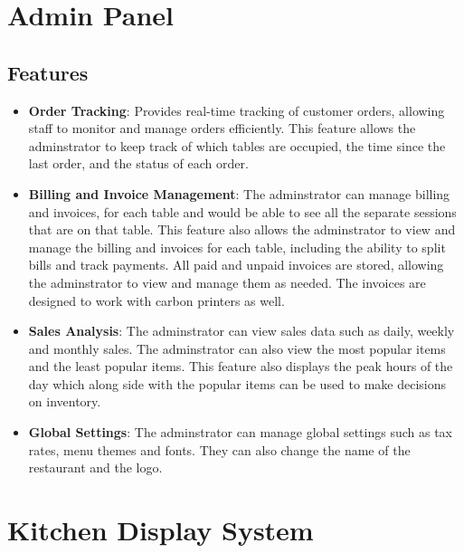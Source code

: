\section{Admin Panel}
\subsection{Features}
\begin{itemize}
    \item \textbf{Order Tracking}: Provides real-time tracking of customer orders, allowing staff to monitor and manage orders efficiently. This feature allows the adminstrator to keep track of which tables are occupied, the time since the last order, and the status of each order.
    \item \textbf{Billing and Invoice Management}: The adminstrator can manage billing and invoices, for each table and would be able to see all the separate sessions that are on that table. This feature also allows the adminstrator to view and manage the billing and invoices for each table, including the ability to split bills and track payments. All paid and unpaid invoices are stored, allowing the adminstrator to view and manage them as needed. The invoices are designed to work with carbon printers as well.
    \item \textbf{Sales Analysis}: The adminstrator can view sales data such as daily, weekly and monthly sales. The adminstrator can also view the most popular items and the least popular items. This feature also displays the peak hours of the day which along side with the popular items can be used to make decisions on inventory.
    \item \textbf{Global Settings}: The adminstrator can manage global settings such as tax rates, menu themes and fonts. They can also change the name of the restaurant and the logo.
\end{itemize}

\section{Kitchen Display System}
